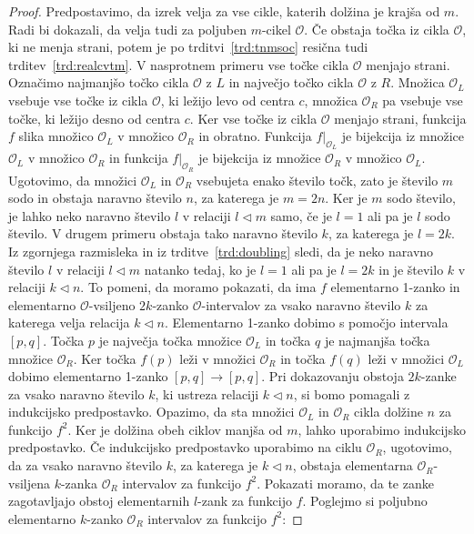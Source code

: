 \documentclass[../TG_magistrsko_delo_sections.tex]{subfiles}
\begin{document}
\begin{proof}
Predpostavimo, da izrek velja za vse cikle, katerih dolžina je krajša od $m$. Radi bi dokazali, da velja tudi za poljuben $m$-cikel $\mathcal{O}$. Če obstaja točka iz cikla $\mathcal{O}$, ki ne menja strani, potem je po trditvi~\ref{trd:tnmsoc} resična tudi trditev~\ref{trd:realcvtm}. V nasprotnem primeru vse točke cikla $\mathcal{O}$ menjajo strani. Označimo najmanjšo točko cikla $\mathcal{O}$  z $L$ in največjo točko cikla $\mathcal{O}$ z $R$. Množica $\mathcal{O}_L$ vsebuje vse točke iz cikla $\mathcal{O}$, ki ležijo levo od centra $c$, množica $\mathcal{O}_R$ pa vsebuje vse točke, ki ležijo desno od centra $c$. Ker vse točke iz cikla $\mathcal{O}$ menjajo strani, funkcija $f$ slika množico $\mathcal{O}_L$ v množico $\mathcal{O}_R$ in obratno. Funkcija $f|_{\mathcal{O}_L}$ je bijekcija iz množice $\mathcal{O}_L$ v množico $\mathcal{O}_R$ in funkcija $f|_{\mathcal{O}_R}$ je bijekcija iz množice $\mathcal{O}_R$ v množico $\mathcal{O}_L$. Ugotovimo, da množici $\mathcal{O}_L$ in $\mathcal{O}_R$ vsebujeta enako število točk, zato je število $m$ sodo in obstaja naravno število $n$, za katerega je $m = 2 n$. Ker je $m$ sodo število, je lahko neko naravno število $l$ v relaciji $l \triangleleft m$ samo, če je $l=1$ ali pa je $l$ sodo število. V drugem primeru obstaja tako naravno število $k$, za katerega je $l = 2 k$. Iz zgornjega razmisleka in iz trditve~\ref{trd:doubling} sledi, da je neko naravno število $l$ v relaciji $l \triangleleft m$ natanko tedaj, ko je $l=1$ ali pa je $l=2k$ in je število $k$ v relaciji $k \triangleleft n$. To pomeni, da moramo pokazati, da ima $f$ elementarno 1-zanko in elementarno $\mathcal{O}$-vsiljeno $2k$-zanko $\mathcal{O}$-intervalov za vsako naravno število $k$ za katerega velja relacija $k \triangleleft n$. Elementarno 1-zanko dobimo s pomočjo intervala $[p, q]$. Točka $p$ je največja točka množice $\mathcal{O}_L$ in točka $q$ je najmanjša točka množice $\mathcal{O}_R$. Ker točka $f(p)$ leži v množici $\mathcal{O}_R$ in točka $f(q)$ leži v množici $\mathcal{O}_L$ dobimo elementarno 1-zanko $[p, q] \to [p, q]$.
Pri dokazovanju obstoja $2k$-zanke za vsako naravno število $k$, ki ustreza relaciji $k \triangleleft n$, si bomo pomagali z indukcijsko predpostavko. Opazimo, da sta množici $\mathcal{O}_L$ in $\mathcal{O}_R$  cikla dolžine $n$ za funkcijo $f^2$. Ker je dolžina obeh ciklov manjša od $m$, lahko uporabimo indukcijsko predpostavko. Če indukcijsko predpostavko uporabimo na ciklu $\mathcal{O}_R$, ugotovimo, da za vsako naravno število $k$, za katerega je $k \triangleleft n$, obstaja elementarna $\mathcal{O}_R$-vsiljena $k$-zanka $\mathcal{O}_R$ intervalov za funkcijo $f^2$. Pokazati moramo, da te zanke zagotavljajo obstoj elementarnih $l$-zank za funkcijo $f$. Poglejmo si poljubno elementarno $k$-zanko $\mathcal{O}_R$ intervalov za funkcijo $f^2$:

\end{proof}
\end{document}
